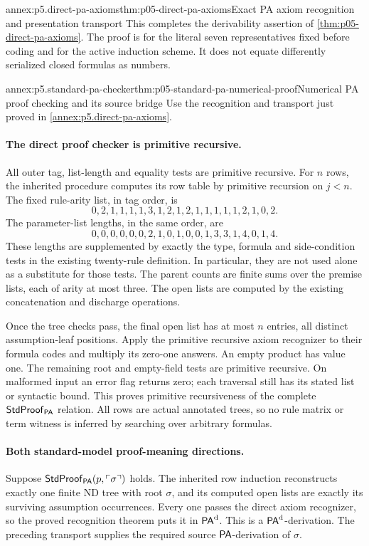 \begin{annexitem}{annex:p5.direct-pa-axioms}{thm:p05-direct-pa-axioms}{Exact PA axiom recognition and presentation transport}
This completes the derivability assertion of
\cref{thm:p05-direct-pa-axioms}.  The proof is for the literal seven
representatives fixed before coding and for the active induction scheme.
It does not equate differently serialized closed formulas as numbers.
\end{annexitem}

\begin{annexitem}{annex:p5.standard-pa-checker}{thm:p05-standard-pa-numerical-proof}{Numerical PA proof checking and its source bridge}
Use the recognition and transport just proved in
\cref{annex:p5.direct-pa-axioms}.
\paragraph{The direct proof checker is primitive recursive.}
All outer tag, list-length and equality tests are primitive recursive.
For \(n\) rows, the inherited procedure computes its row table by
primitive recursion on \(j<n\).  The fixed rule-arity list, in tag order,
is
\[
 0,2,1,1,1,1,3,1,2,1,2,1,1,1,1,1,2,1,0,2.
\]
The parameter-list lengths, in the same order, are
\[
 0,0,0,0,0,0,2,1,0,1,0,0,1,3,3,1,4,0,1,4.
\]
These lengths are supplemented by exactly the type, formula and side-condition
tests in the existing twenty-rule definition.  In particular, they are not
used alone as a substitute for those tests.  The parent counts are finite
sums over the premise lists, each of arity at most three.  The open lists
are computed by the existing concatenation and discharge operations.

Once the tree checks pass, the final open list has at most \(n\) entries,
all distinct assumption-leaf positions.  Apply the primitive recursive axiom
recognizer to their formula codes and multiply its zero-one answers.
An empty product has value one.  The remaining root and empty-field tests
are primitive recursive.  On malformed input an error flag returns zero;
each traversal still has its stated list or syntactic bound.  This proves
primitive recursiveness of the complete \(\mathsf{StdProof}_{\mathsf{PA}}\)
relation.  All rows are actual annotated trees, so no rule matrix or term
witness is inferred by searching over arbitrary formulas.

\paragraph{Both standard-model proof-meaning directions.}
Suppose \(\mathsf{StdProof}_{\mathsf{PA}}(p,\ulcorner\sigma\urcorner)\) holds.
The inherited row induction reconstructs exactly one finite ND tree with
root \(\sigma\), and its computed open lists are exactly its surviving
assumption occurrences.  Every one passes the direct axiom recognizer,
so the proved recognition theorem puts it in \(\mathsf{PA}^{\rm d}\).
This is a \(\mathsf{PA}^{\rm d}\)-derivation.  The preceding transport supplies
the required source \(\mathsf{PA}\)-derivation of \(\sigma\).


\end{annexitem}

